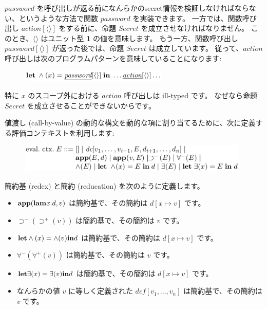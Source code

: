 \documentclass[submit,techreq,noauthor,onecolumn]{ipsj}
\begin{document}
\noindent \underline{$password$} を呼び出しが返る前になんらかのsecret情報を検証しなければならない、というような方法で関数 \underline{$password$} を実装できます。
一方では、関数呼び出し \underline{$action$}$[\langle\rangle]$ をする前に、命題 \underline{$Secret$} を成立させなければなりません。
このとき、$\langle\rangle$ はユニット型 {\bf 1} の値を意味します。
もう一方、関数呼び出し \underline{$password$}$[\langle\rangle]$ が返った後では、命題 \underline{$Secret$} は成立しています。
従って、\underline{$action$} 呼び出しは次のプログラムパターンを意味していることになります:

\begin{figure}[h]
\centering
\includegraphics[width=7cm]{img/infig22_letin.png}
\end{figure}

\noindent 特に $x$ のスコープ外における \underline{$action$} 呼び出しは ill-typed です。
なぜなら命題 \underline{$Secret$} を成立させることができないからです。

値渡し (call-by-value) の動的な構文を動的な項に割り当てるために、次に定義する評価コンテキストを利用します:

\begin{figure}[h]
\centering
\includegraphics[width=11cm]{img/infig22_eval.png}
\end{figure}

簡約基 (redex) と簡約 (reducation) を次のように定義します。

\begin{itemize}
  \item ${\bf app}({\bf lam} x.d, v)$ は簡約基で、その簡約は $d[x \mapsto v]$ です。
  \item $\supset^- (\supset^+ (v))$ は簡約基で、その簡約は $v$ です。
  \item ${\bf let} \wedge (x) = \wedge (v) {\bf in} d$ は簡約基で、その簡約は $d[x \mapsto v]$ です。
  \item $\forall^- (\forall^+ (v))$ は簡約基で、その簡約は $v$ です。
  \item ${\bf let} \exists (x) = \exists (v) {\bf in} d$ は簡約基で、その簡約は $d[x \mapsto v]$ です。
  \item なんらかの値 $v$ に等しく定義された $dcf[v_1,\ldots,v_n]$ は簡約基で、その簡約は $v$ です。
\end{itemize}
\end{document}
